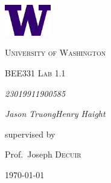 \documentclass[9pt,a4paper]{report}
\begin{document}
	\begin{titlepage}
		\centering
		\vspace*{1.5in}
		\includegraphics[width=0.15\textwidth]{W-Logo_Purple_RGB}\par\vspace{1cm}
		{\LARGE \textsc{University of Washington}\par}
		\vspace{1cm}
		{\Large \textsc{BEE331 Lab 1.1}\par}
		\vspace{1.5cm}
		{\huge\bfseries \par}
		\vspace{2cm}
		{\Large\itshape 2301991\hspace{55pt}1900585\par}
		{\Large\itshape Jason Truong\hspace{31pt}Henry Haight\par}
		\vfill
		supervised by\par
		Prof.~Joseph \textsc{Decuir}
		\date{2024\\ January}
		\vfill
		{\large \today\par}
		\vspace*{1.5in}
	\end{titlepage}
	
\end{document}
